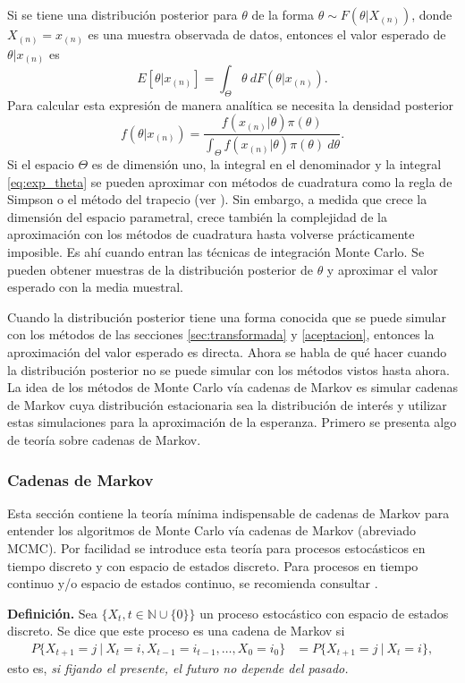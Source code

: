 \documentclass[11pt,a4paper]{article}
\begin{document}
Si se tiene una distribución posterior para $\theta$ de la forma $\theta \sim F(\theta | X_{(n)})$, donde $X_{(n)} = x_{(n)}$ es una muestra observada de datos, entonces el valor esperado de $\theta| x_{(n)}$ es
\begin{equation}
\label{eq:exp_theta}
E[\theta | x_{(n)}] = \int_{\Theta} \theta \ dF(\theta | x_{(n)}).
\end{equation}
Para calcular esta expresión de manera analítica se necesita la densidad posterior $$f(\theta | x_{(n)}) = \frac{f(x_{(n)} | \theta)\pi (\theta)}{\int_{\Theta} f(x_{(n)} | \theta)\pi (\theta) \ d\theta}.$$ Si el espacio $\Theta$ es de dimensión uno, la integral en el denominador y la integral \eqref{eq:exp_theta} se pueden aproximar con métodos de cuadratura como la regla de Simpson o el método del trapecio (ver \citet{burden}). Sin embargo, a medida que crece la dimensión del espacio parametral, crece también la complejidad de la aproximación con los métodos de cuadratura hasta volverse prácticamente imposible. Es ahí cuando entran las técnicas de integración Monte Carlo. Se pueden obtener muestras de la distribución posterior de $\theta$ y aproximar el valor esperado con la media muestral.

Cuando la distribución posterior tiene una forma conocida que se puede simular con los métodos de las secciones \ref{sec:transformada} y \ref{aceptacion}, entonces la aproximación del valor esperado es directa. Ahora se habla de qué hacer cuando la distribución posterior no se puede simular con los métodos vistos hasta ahora. La idea de los métodos de Monte Carlo vía cadenas de Markov es simular cadenas de Markov cuya distribución estacionaria sea la distribución de interés y utilizar estas simulaciones para la aproximación de la esperanza. Primero se presenta algo de teoría sobre cadenas de Markov.

\newpage

\subsubsection*{Cadenas de Markov}
Esta sección contiene la teoría mínima indispensable de cadenas de Markov para entender los algoritmos de Monte Carlo vía cadenas de Markov (abreviado MCMC). Por facilidad se introduce esta teoría para procesos estocásticos en tiempo discreto y con espacio de estados discreto. Para procesos en tiempo continuo y/o espacio de estados continuo, se recomienda consultar \citet{ross}.

\textbf{Definición.} Sea $\lbrace X_t, t \in \mathbb{N} \cup \lbrace 0 \rbrace \rbrace$ un proceso estocástico con espacio de estados discreto. Se dice que este proceso es una cadena de Markov si 
\begin{align*}
P\lbrace X_{t+1} = j \ | \ X_t = i, X_{t-1} = i_{t-1}, \dots, X_0 = i_0\rbrace &= P\lbrace X_{t+1} = j \ | \ X_t = i\rbrace,
\end{align*}
esto es, \textit{si fijando el presente, el futuro no depende del pasado.}
\end{document}
